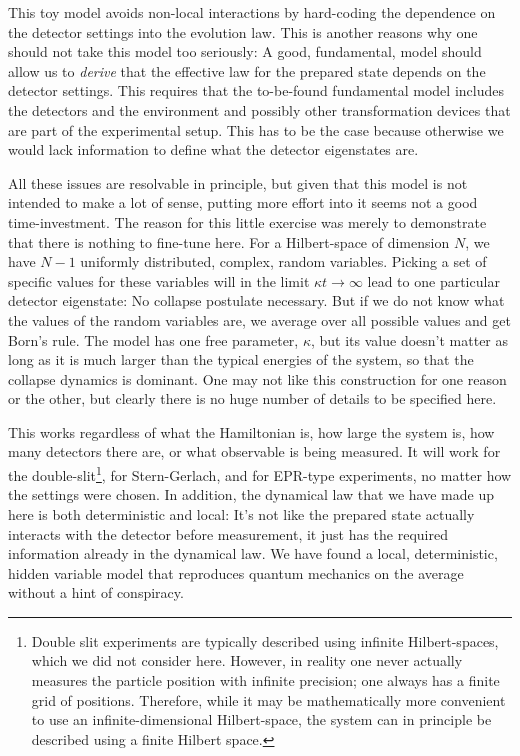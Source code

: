 \documentclass[12pt]{article}
\begin{document}
This toy model avoids non-local interactions by hard-coding the dependence on the detector settings into the evolution law.  This is another reasons why one should not take this model too seriously: A good, fundamental, model should allow us to {\sl derive} that the effective law for the prepared state depends on the detector settings. This requires that the to-be-found fundamental model includes the detectors and the environment and possibly other transformation devices that are part of the experimental setup. This has to be the case because otherwise we would lack information to define what the detector eigenstates are.

All these issues are resolvable in principle, but given that this model is not intended to make a lot of sense, putting more effort into it seems not a good time-investment. The reason for this little exercise was merely to demonstrate that there is nothing to fine-tune here. 
For a Hilbert-space of dimension $N$, we have $N-1$ uniformly distributed, complex, random variables. Picking a set of specific values for these variables will in the limit $\kappa t \to \infty$ lead to one particular detector eigenstate: No collapse postulate necessary. But if we do not know what the values of the random variables are, we average over all possible values and get Born's rule. The model has one free parameter, $\kappa$, but its value doesn't matter as long as it is much larger than the typical energies of the system, so that the collapse dynamics is dominant. One may not like this construction for one reason or the other, but clearly there is no huge number of details to be specified here.

This works regardless of what the Hamiltonian is, how large the system is, how many detectors there are, or what observable is being measured. It will work for the double-slit\footnote{Double slit experiments are typically described using infinite Hilbert-spaces, which we did not consider here. However, in reality one never actually measures the particle position with infinite precision; one always has a finite grid of positions. Therefore, while it may be mathematically more convenient to use an infinite-dimensional Hilbert-space, the system can in principle be described using a finite Hilbert space.}, for Stern-Gerlach, and for {\sc EPR}-type
experiments, no matter how the settings were chosen. In addition, the dynamical law that we have made up here is both deterministic and local: It's not like the prepared state actually interacts with the detector before measurement, it just has the required information already in the dynamical law. We have found a local, deterministic, hidden variable model that reproduces quantum mechanics on the average without a hint of conspiracy. 
\end{document}
